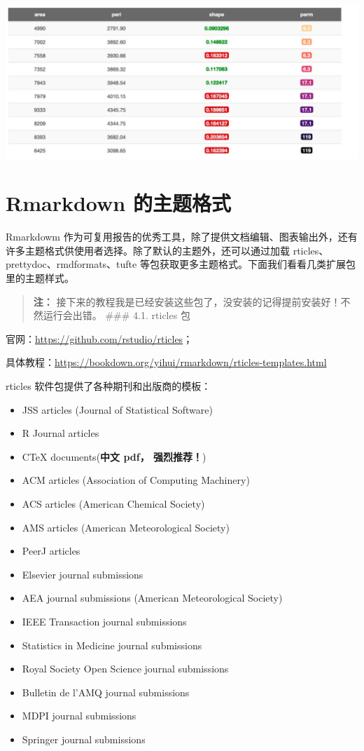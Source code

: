 \documentclass[
]{book}
\providecommand{\tightlist}{%
  \setlength{\itemsep}{0pt}\setlength{\parskip}{0pt}}
\begin{document}
\includegraphics{images/paste-26331167.png}

\hypertarget{rmarkdown-ux7684ux4e3bux9898ux683cux5f0f}{%
\section{Rmarkdown 的主题格式}\label{rmarkdown-ux7684ux4e3bux9898ux683cux5f0f}}

Rmarkdowm
作为可复用报告的优秀工具，除了提供文档编辑、图表输出外，还有许多主题格式供使用者选择。除了默认的主题外，还可以通过加载
rticles、prettydoc、rmdformats、tufte
等包获取更多主题格式。下面我们看看几类扩展包里的主题样式。

\begin{quote}
\textbf{注：}
接下来的教程我是已经安装这些包了，没安装的记得提前安装好！不然运行会出错。
\#\#\# 4.1. rticles 包
\end{quote}

官网：\url{https://github.com/rstudio/rticles}；

具体教程：\url{https://bookdown.org/yihui/rmarkdown/rticles-templates.html}

rticles 软件包提供了各种期刊和出版商的模板：

\begin{itemize}
\tightlist
\item
  JSS articles (Journal of Statistical Software)
\item
  R Journal articles
\item
  CTeX documents(\textbf{中文 pdf， 强烈推荐！})
\item
  ACM articles (Association of Computing Machinery)
\item
  ACS articles (American Chemical Society)
\item
  AMS articles (American Meteorological Society)
\item
  PeerJ articles
\item
  Elsevier journal submissions
\item
  AEA journal submissions (American Meteorological Society)
\item
  IEEE Transaction journal submissions
\item
  Statistics in Medicine journal submissions
\item
  Royal Society Open Science journal submissions
\item
  Bulletin de l'AMQ journal submissions
\item
  MDPI journal submissions
\item
  Springer journal submissions
\end{itemize}
\end{document}

